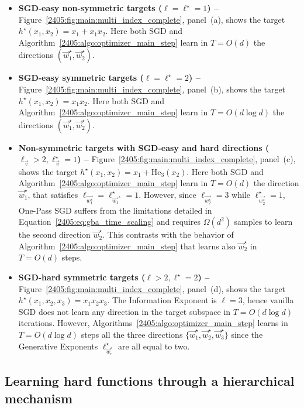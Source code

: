 \begin{itemize}
\item \textbf{SGD-easy non-symmetric targets ($\ell  =  \ell^\star  =  1$) --} Figure~\ref{2405:fig:main:multi_index_complete}, panel~(a), shows the target $h^\star(x_1,x_2) = x_1 + x_1x_2$. Here both SGD and Algorithm~\ref{2405:algo:optimizer_main_step} learn in $T= O(d)$ the directions $(\vec w^\star_1, \vec w^\star_2)$.

\item \textbf{SGD-easy symmetric targets ($\ell  =  \ell^\star  =  2$) --} Figure~\ref{2405:fig:main:multi_index_complete}, panel~(b), shows the target $h^\star(x_1,x_2) = x_1x_2$.  Here both SGD and Algorithm~\ref{2405:algo:optimizer_main_step} learn in $T=O(d \log d)$ the directions $(\vec w^\star_1, \vec w^\star_2)$. 

\item \textbf{Non-symmetric targets with SGD-easy and hard directions ($\ell_{\vec{v}} > 2, \ell^\star_{\vec{v}}=1$) --} Figure~\ref{2405:fig:main:multi_index_complete}, panel~(c), shows the target $h^\star(x_1,x_2)  =  x_1  +  \mathrm{He}_3(x_2) $. Here both SGD and Algorithm~\ref{2405:algo:optimizer_main_step} learn in $T=O(d)$ the direction $\vec w^\star_1$, that satisfies $\ell_{\vec{w_1^\star}} = \ell_{\vec{w_1}^\star}^\star = 1$. However, since $\ell_{\vec{w_2^\star}} = 3$ while $\ell_{\vec{w_2^\star}}^\star = 1$, One-Pass SGD suffers from the limitations detailed in Equation~\eqref{2405:eq:gba_time_scaling} and requires $\Omega(d^2)$ samples to learn the second direction $\vec w^\star_2$. This contrasts with the behavior of Algorithm~\ref{2405:algo:optimizer_main_step} that learns also $\vec w^\star_2$ in $T=O(d)$ steps.

\item \textbf{SGD-hard symmetric targets ($\ell > 2,  \ell^\star =2$) --} Figure~\ref{2405:fig:main:multi_index_complete}, panel~(d), shows the target $h^\star(x_1,x_2,x_3) = x_1 x_2 x_3$. The Information Exponent is $\ell=3$, hence vanilla SGD does not learn any direction in the target subspace in $T=O(d \log d)$ iterations. However, Algorithms~\ref{2405:algo:optimizer_main_step} learns in $T=O(d \log d)$ steps all the three directions $\{\vec w^\star_1, \vec w^\star_2, \vec w^\star_3\}$ since the Generative Exponents $\ell_{\vec{w}^\star_r}^\star$ are all equal to two.
\end{itemize}


\subsection{Learning hard functions through a hierarchical mechanism}\label{2405:subsec:staircase}

